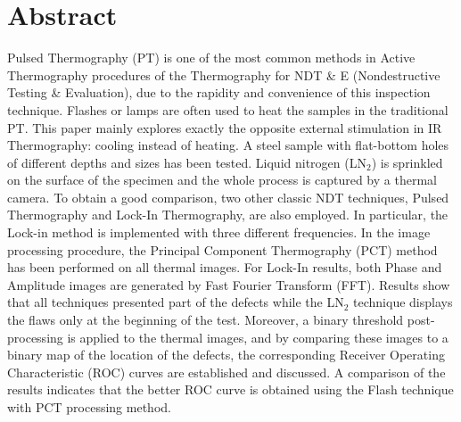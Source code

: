 
\section*{Abstract}
Pulsed Thermography (PT) is one of the most common methods in Active Thermography procedures of the Thermography for NDT \& E (Nondestructive Testing \& Evaluation), due to the rapidity and convenience of this inspection technique. Flashes or lamps are often used to heat the samples in the traditional PT. This paper mainly explores exactly the opposite external stimulation in IR Thermography: cooling instead of heating. A steel sample with flat-bottom holes of different depths and sizes has been tested. Liquid nitrogen (LN$_2$) is sprinkled on the surface of the specimen and the whole process is captured by a thermal camera. To obtain a good comparison, two other classic NDT techniques, Pulsed Thermography and Lock-In Thermography, are also employed. In particular, the  Lock-in  method  is  implemented  with  three  different  frequencies.  In  the  image  processing  procedure,  the Principal Component Thermography (PCT) method has been performed on all thermal images. For Lock-In results, both Phase and Amplitude images are generated by Fast Fourier Transform (FFT). Results show that all techniques presented part of the defects while the LN$_2$ technique displays the flaws only at the beginning of the test. Moreover, a binary threshold post-processing is applied to the thermal images, and by comparing these images to a binary map of the location of the defects, the corresponding Receiver Operating Characteristic (ROC) curves are established and discussed. A comparison of the results indicates that the better ROC curve is obtained using the Flash technique with PCT processing method.  

